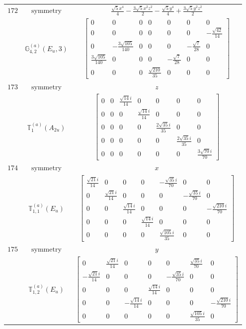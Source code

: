 \documentclass[fleqn,8pt,landscape]{jsarticle}
\begin{document}
\begin{longtable}{ccc}
$ 172 $ & $ \text{symmetry} $ & $ \frac{\sqrt{5} x^{4}}{4} - \frac{3 \sqrt{5} x^{2} z^{2}}{2} - \frac{\sqrt{5} y^{4}}{4} + \frac{3 \sqrt{5} y^{2} z^{2}}{2} $ \\
$  $ & $ \mathbb{G}_{4,2}^{(a)}(E_{u},3) $ & $ \begin{bmatrix} 0 & 0 & 0 & 0 & 0 & 0 & 0 \\ 0 & 0 & 0 & 0 & 0 & 0 & - \frac{\sqrt{42}}{14} \\ 0 & - \frac{3 \sqrt{105}}{140} & 0 & 0 & 0 & - \frac{\sqrt{7}}{28} & 0 \\ \frac{3 \sqrt{105}}{140} & 0 & 0 & 0 & - \frac{\sqrt{7}}{28} & 0 & 0 \\ 0 & 0 & 0 & \frac{\sqrt{210}}{35} & 0 & 0 & 0 \end{bmatrix} $ \\ \hline
$ 173 $ & $ \text{symmetry} $ & $ z $ \\
$  $ & $ \mathbb{T}_{1}^{(a)}(A_{2u}) $ & $ \begin{bmatrix} 0 & 0 & \frac{\sqrt{14} i}{14} & 0 & 0 & 0 & 0 \\ 0 & 0 & 0 & \frac{\sqrt{14} i}{14} & 0 & 0 & 0 \\ 0 & 0 & 0 & 0 & \frac{2 \sqrt{35} i}{35} & 0 & 0 \\ 0 & 0 & 0 & 0 & 0 & \frac{2 \sqrt{35} i}{35} & 0 \\ 0 & 0 & 0 & 0 & 0 & 0 & \frac{3 \sqrt{70} i}{70} \end{bmatrix} $ \\ \hline
$ 174 $ & $ \text{symmetry} $ & $ x $ \\
$  $ & $ \mathbb{T}_{1,1}^{(a)}(E_{u}) $ & $ \begin{bmatrix} \frac{\sqrt{21} i}{14} & 0 & 0 & 0 & - \frac{\sqrt{35} i}{70} & 0 & 0 \\ 0 & \frac{\sqrt{21} i}{14} & 0 & 0 & 0 & - \frac{\sqrt{35} i}{70} & 0 \\ 0 & 0 & \frac{\sqrt{14} i}{14} & 0 & 0 & 0 & - \frac{\sqrt{210} i}{70} \\ 0 & 0 & 0 & \frac{\sqrt{14} i}{14} & 0 & 0 & 0 \\ 0 & 0 & 0 & 0 & \frac{\sqrt{105} i}{35} & 0 & 0 \end{bmatrix} $ \\ \hline
$ 175 $ & $ \text{symmetry} $ & $ y $ \\
$  $ & $ \mathbb{T}_{1,2}^{(a)}(E_{u}) $ & $ \begin{bmatrix} 0 & \frac{\sqrt{21} i}{14} & 0 & 0 & 0 & \frac{\sqrt{35} i}{70} & 0 \\ - \frac{\sqrt{21} i}{14} & 0 & 0 & 0 & - \frac{\sqrt{35} i}{70} & 0 & 0 \\ 0 & 0 & 0 & \frac{\sqrt{14} i}{14} & 0 & 0 & 0 \\ 0 & 0 & - \frac{\sqrt{14} i}{14} & 0 & 0 & 0 & - \frac{\sqrt{210} i}{70} \\ 0 & 0 & 0 & 0 & 0 & \frac{\sqrt{105} i}{35} & 0 \end{bmatrix} $ \\ \hline

\end{longtable}
\end{document}
